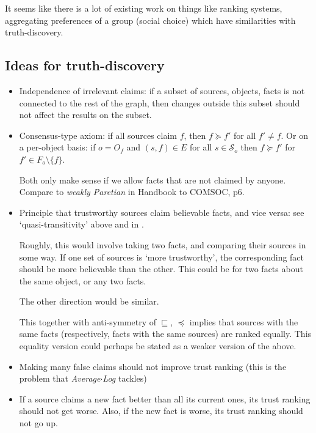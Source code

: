 \documentclass{article}
\theoremstyle{definition} \newtheorem{definition}{Definition}
\theoremstyle{definition} \newtheorem{example}{Example}
\theoremstyle{plain} \newtheorem{axiom}{Axiom}
\theoremstyle{plain} \newtheorem*{remark}{Remark}
\theoremstyle{remark} \newtheorem*{notation}{Notation}
\theoremstyle{plain} \newtheorem{lemma}{Lemma}
\theoremstyle{plain} \newtheorem{proposition}{Proposition}
\renewcommand{\S}{\mathcal{S}}  %
\newcommand{\sle}{\sqsubseteq}
\newcommand{\fle}{\preceq}
\newcommand{\fge}{\succeq}
\begin{document}
It seems like there is a lot of existing work on things like ranking systems,
aggregating preferences of a group (social choice) which have similarities with
truth-discovery.

\subsection{Ideas for truth-discovery}
\begin{itemize}

\item Independence of irrelevant claims: if a subset of sources, objects, facts
is not connected to the rest of the graph, then changes outside this subset
should not affect the results on the subset.

\item Consensus-type axiom: if all sources claim $f$, then $f \fge f'$ for all
$f' \ne f$. Or on a per-object basis: if $o = O_f$ and $(s, f) \in E$ for all
$s \in \S_o$ then $f \fge f'$ for $f' \in F_o \setminus \{f\}$.

Both only make sense if we allow facts that are not claimed by anyone. Compare
to \emph{weakly Paretian} in Handbook to COMSOC, p6.

\item Principle that trustworthy sources claim believable facts, and vice
versa: see `quasi-transitivity' above and in \cite{altman_personalised}.

Roughly, this would involve taking two facts, and comparing their sources in
some way. If one set of sources is `more trustworthy', the corresponding fact
should be more believable than the other. This could be for two facts about the
same object, or any two facts.

The other direction would be similar.

This together with anti-symmetry of $\sle$, $\fle$ implies that sources with
the same facts (respectively, facts with the same sources) are ranked equally.
This equality version could perhaps be stated as a weaker version of the above.

\item Making many false claims should not improve trust ranking (this is the
problem that \emph{Average${\cdot}$Log} tackles)

\item If a source claims a new fact better than all its current ones, its trust
ranking should not get worse. Also, if the new fact is worse, its trust ranking
should not go up.


\end{itemize}
\end{document}
